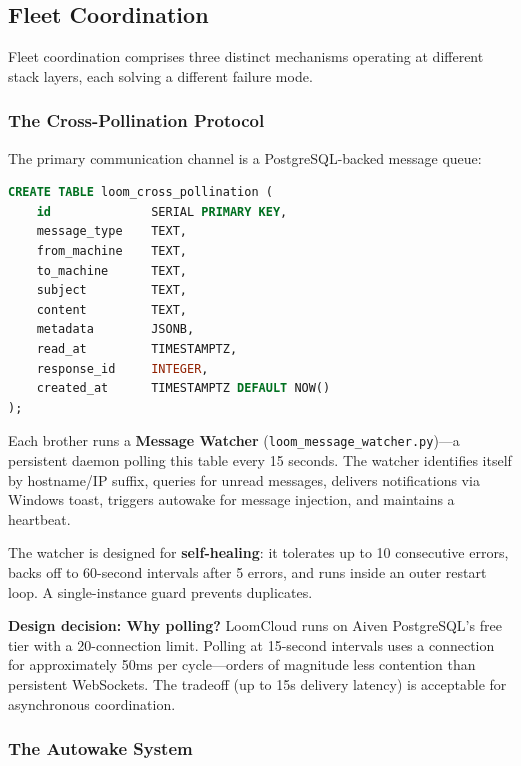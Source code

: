 \documentclass[11pt,a4paper]{article}
\begin{document}

\subsection{Fleet Coordination}
\label{sec:fleet-coordination}

Fleet coordination comprises three distinct mechanisms operating at different stack layers, each solving a different failure mode.


\subsubsection{The Cross-Pollination Protocol}
\label{sec:cross-pollination}

The primary communication channel is a PostgreSQL-backed message queue:

\begin{lstlisting}[language=SQL,caption={Cross-pollination message schema.}]
CREATE TABLE loom_cross_pollination (
    id              SERIAL PRIMARY KEY,
    message_type    TEXT,
    from_machine    TEXT,
    to_machine      TEXT,
    subject         TEXT,
    content         TEXT,
    metadata        JSONB,
    read_at         TIMESTAMPTZ,
    response_id     INTEGER,
    created_at      TIMESTAMPTZ DEFAULT NOW()
);
\end{lstlisting}

Each brother runs a \textbf{Message Watcher} (\texttt{loom\_message\_watcher.py})---a persistent daemon polling this table every 15 seconds. The watcher identifies itself by hostname/IP suffix, queries for unread messages, delivers notifications via Windows toast, triggers autowake for message injection, and maintains a heartbeat.

The watcher is designed for \textbf{self-healing}: it tolerates up to 10 consecutive errors, backs off to 60-second intervals after 5 errors, and runs inside an outer restart loop. A single-instance guard prevents duplicates.

\textbf{Design decision: Why polling?} LoomCloud runs on Aiven PostgreSQL's free tier with a 20-connection limit. Polling at 15-second intervals uses a connection for approximately 50ms per cycle---orders of magnitude less contention than persistent WebSockets. The tradeoff (up to 15s delivery latency) is acceptable for asynchronous coordination.


\subsubsection{The Autowake System}
\label{sec:autowake}
\end{document}
